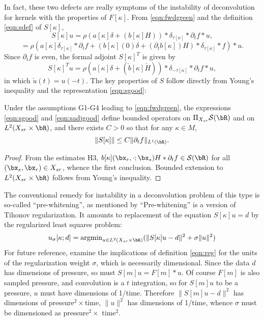 In fact, these two defects are really symptoms of the instability of
deconvolution for kernels with the properties of $F[\kappa]$.  From \ref{eqn:fwdgreen} and the
definition \ref{eqn:sdef} of  $S[\kappa]$,
\[
  S[\kappa]u = \rho( a[\kappa]\delta    +  (b[\kappa]H)) *\delta_{\tau[\kappa]}*\partial_t f *u,
\]
\begin{equation}
  \label{eqn:sgood}
  = \rho(a[\kappa]\delta_{\tau[\kappa]}*\partial_t f +
  (b[\kappa](0)\delta + (\partial_t b[\kappa])H)
  *\delta_{\tau[\kappa]}*f) * u.
\end{equation}
Since $\partial_t f$ is even, the formal adjoint $S[\kappa]^T$ is given by
\begin{equation}
  \label{eqn:sadjgood}
  S[\kappa]^Tu = \rho( a[\kappa]\delta    +  (\check{b}[\kappa]\check{H}))
  *\delta_{-\tau[\kappa]}*\partial_t f *u,
\end{equation}
in which $\check{u}(t) = u(-t)$.
The key properties of $S$ follow directly from Young's inequality and
the representation \ref{eqn:sgood}:
\begin{lemma}
  \label{thm:snorm}
  Under the assumptions G1-G4 leading to \ref{eqn:fwdgreen}, the
  expressions \ref{eqn:sgood} and \ref{eqn:sadjgood} define
  bounded operators on
  $\Pi_{X_{sr}} {\cal S}(\bR)$ and on
  $L^2(X_{sr} \times \bR)$, and there exists $C>0$ so
  that for any $\kappa \in M$,
  \begin{equation}
    \label{eqn:snorm}
    \|S[\kappa]\| \le C\|\partial_t f\|_{L^1(\bR)}.
  \end{equation}
\end{lemma}
\begin{proof} From the estimates H3, $b[\kappa](\bx_r,\cdot;\bx_s)H *
  \partial_tf \in {\cal S}(\bR)$ for all $(\bx_s,\bx_r) \in X_{sr}$,
  whence the first conclusion. Bounded extension to $L^2(X_{sr} \times
  \bR)$ follows from Young's inequality.
\end{proof}
  
The conventional remedy for instability in a deconvolution problem of
this type is so-called ``pre-whitening'', as
mentioned by \cite{Warner:16} ``Pre-whitening'' is a version of
Tihonov regularization. It  amounts to replacement of the equation
$S[\kappa]u=d$ by the regularized least squares problem: 
\begin{equation}
  \label{eqn:reg}
  u_{\sigma}[\kappa;d] = \mbox{argmin}_{u \in L^2(X_{sr} \times \bR)} (\|S[\kappa]u-d\|^2 + \sigma\|u\|^2)
\end{equation}
For future reference, examine the
implications of definition \ref{eqn:reg} for the units of the regularization weight $\sigma$,
which  is
necessarily dimensional. Since the data $d$ has dimensions of
pressure, so must $S[m]u = F[m]*u$. Of course $F[m]$ is also sampled
pressure, and convolution is a $t$ integration, so for $S[m]u$ to be a
pressure, $u$ must have dimensions of 1/time. Therefore
$\|S[m]u-d\|^2$ has dimensions of pressure$^2 \times $time, $\|u\|^2$ has
dimensions of 1/time, whence $\sigma$ must be dimensioned as
pressure$^2 \times$  time$^2$.

